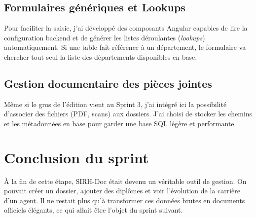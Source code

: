 \subsection{Formulaires génériques et Lookups}

Pour faciliter la saisie, j'ai développé des composants Angular capables de lire la configuration backend et de générer les listes déroulantes (\textit{lookups}) automatiquement. Si une table fait référence à un département, le formulaire va chercher tout seul la liste des départements disponibles en base.

\subsection{Gestion documentaire des pièces jointes}

Même si le gros de l'édition vient au Sprint 3, j'ai intégré ici la possibilité d'associer des fichiers (PDF, scans) aux dossiers. J'ai choisi de stocker les chemins et les métadonnées en base pour garder une base SQL légère et performante.

\section{Conclusion du sprint}

À la fin de cette étape, SIRH-Doc était devenu un véritable outil de gestion. On pouvait créer un dossier, ajouter des diplômes et voir l'évolution de la carrière d'un agent. Il ne restait plus qu'à transformer ces données brutes en documents officiels élégants, ce qui allait être l'objet du sprint suivant.

